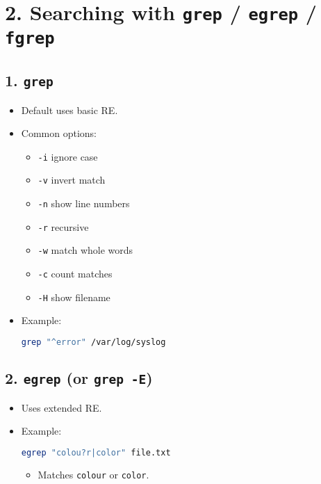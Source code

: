 \documentclass[a4paper]{report}
\begin{document}
\section*{2. Searching with \texttt{grep} / \texttt{egrep} / \texttt{fgrep}}

\subsection*{1. \texttt{grep}}
\begin{itemize}
    \item Default uses basic RE.
    \item Common options:
        \begin{itemize}
            \item \texttt{-i} ignore case
            \item \texttt{-v} invert match
            \item \texttt{-n} show line numbers
            \item \texttt{-r} recursive
            \item \texttt{-w} match whole words
            \item \texttt{-c} count matches
            \item \texttt{-H} show filename
        \end{itemize}
    \item Example:
\begin{lstlisting}[language=bash]
grep "^error" /var/log/syslog
\end{lstlisting}
\end{itemize}

\subsection*{2. \texttt{egrep} (or \texttt{grep -E})}
\begin{itemize}
    \item Uses extended RE.
    \item Example:
\begin{lstlisting}[language=bash]
egrep "colou?r|color" file.txt
\end{lstlisting}
    \begin{itemize}
        \item Matches \texttt{colour} or \texttt{color}.
    \end{itemize}
\end{itemize}
\end{document}

